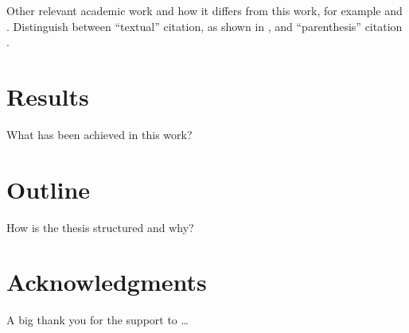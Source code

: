 Other relevant academic work and how it differs from this work, for
example \citet{shannon_diff} and \citet{blowfish}. Distinguish between
``textual'' citation, as shown in \citet{shannon_diff}, and
``parenthesis'' citation \citep{blowfish}.



\section{Results}

What has been achieved in this work? 


\section{Outline}

How is the thesis structured and why? 


\section{Acknowledgments}

A big thank you for the support to \ldots 

